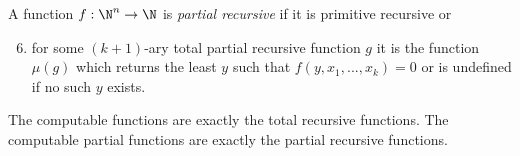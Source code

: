 \documentclass{article}
\begin{document}
\begin{definition}
    A function $f:\N^n\to\N$ is \emph{partial recursive} if it is primitive recursive or 
    \begin{enumerate}[label=R\arabic*.]
        \setcounter{enumi}{5}
        \item for some $(k+1)$-ary total partial recursive function $g$ it is the function $\mu(g)$
            which returns the least $y$ such that $f(y,x_1,...,x_k)=0$ or is undefined if no such $y$
            exists.
    \end{enumerate}
\end{definition}

\begin{theorem}[Notes I.45]
    The computable functions are exactly the total recursive functions. The computable partial functions 
    are exactly the partial recursive functions. 
\end{theorem}
\end{document}
